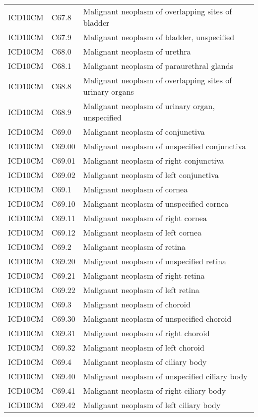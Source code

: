 \begin{longtable}{p{}p{}p{}}
  ICD10CM & C67.8 & Malignant neoplasm of overlapping sites of bladder \\ 
  ICD10CM & C67.9 & Malignant neoplasm of bladder, unspecified \\ 
  ICD10CM & C68.0 & Malignant neoplasm of urethra \\ 
  ICD10CM & C68.1 & Malignant neoplasm of paraurethral glands \\ 
  ICD10CM & C68.8 & Malignant neoplasm of overlapping sites of urinary organs \\ 
  ICD10CM & C68.9 & Malignant neoplasm of urinary organ, unspecified \\ 
  ICD10CM & C69.0 & Malignant neoplasm of conjunctiva \\ 
  ICD10CM & C69.00 & Malignant neoplasm of unspecified conjunctiva \\ 
  ICD10CM & C69.01 & Malignant neoplasm of right conjunctiva \\ 
  ICD10CM & C69.02 & Malignant neoplasm of left conjunctiva \\ 
  ICD10CM & C69.1 & Malignant neoplasm of cornea \\ 
  ICD10CM & C69.10 & Malignant neoplasm of unspecified cornea \\ 
  ICD10CM & C69.11 & Malignant neoplasm of right cornea \\ 
  ICD10CM & C69.12 & Malignant neoplasm of left cornea \\ 
  ICD10CM & C69.2 & Malignant neoplasm of retina \\ 
  ICD10CM & C69.20 & Malignant neoplasm of unspecified retina \\ 
  ICD10CM & C69.21 & Malignant neoplasm of right retina \\ 
  ICD10CM & C69.22 & Malignant neoplasm of left retina \\ 
  ICD10CM & C69.3 & Malignant neoplasm of choroid \\ 
  ICD10CM & C69.30 & Malignant neoplasm of unspecified choroid \\ 
  ICD10CM & C69.31 & Malignant neoplasm of right choroid \\ 
  ICD10CM & C69.32 & Malignant neoplasm of left choroid \\ 
  ICD10CM & C69.4 & Malignant neoplasm of ciliary body \\ 
  ICD10CM & C69.40 & Malignant neoplasm of unspecified ciliary body \\ 
  ICD10CM & C69.41 & Malignant neoplasm of right ciliary body \\ 
  ICD10CM & C69.42 & Malignant neoplasm of left ciliary body \\ 

\end{longtable}

